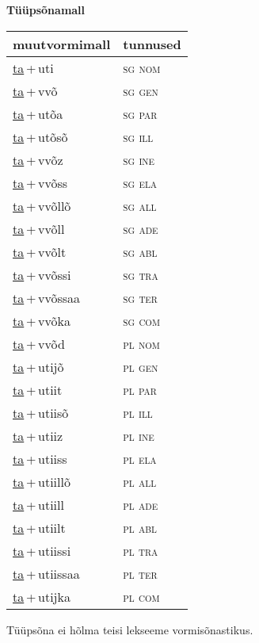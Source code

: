 
\vspace{1.8em}
\begin{minipage}{\textwidth}
\textbf{Tüüpsõnamall \,}\\

\begin{sideways}
\begin{tabular}{l l}
muutvormimall & tunnused \\
\hline
\underline{ta}\,+\,uti & \textsc{ sg nom } \\
\underline{ta}\,+\,vvõ & \textsc{ sg gen } \\
\underline{ta}\,+\,utõa & \textsc{ sg par } \\
\underline{ta}\,+\,utõsõ & \textsc{ sg ill } \\
\underline{ta}\,+\,vvõz & \textsc{ sg ine } \\
\underline{ta}\,+\,vvõss & \textsc{ sg ela } \\
\underline{ta}\,+\,vvõllõ & \textsc{ sg all } \\
\underline{ta}\,+\,vvõll & \textsc{ sg ade } \\
\underline{ta}\,+\,vvõlt & \textsc{ sg abl } \\
\underline{ta}\,+\,vvõssi & \textsc{ sg tra } \\
\underline{ta}\,+\,vvõssaa & \textsc{ sg ter } \\
\underline{ta}\,+\,vvõka & \textsc{ sg com } \\
\underline{ta}\,+\,vvõd & \textsc{ pl nom } \\
\underline{ta}\,+\,utijõ & \textsc{ pl gen } \\
\underline{ta}\,+\,utiit & \textsc{ pl par } \\
\underline{ta}\,+\,utiisõ & \textsc{ pl ill } \\
\underline{ta}\,+\,utiiz & \textsc{ pl ine } \\
\underline{ta}\,+\,utiiss & \textsc{ pl ela } \\
\underline{ta}\,+\,utiillõ & \textsc{ pl all } \\
\underline{ta}\,+\,utiill & \textsc{ pl ade } \\
\underline{ta}\,+\,utiilt & \textsc{ pl abl } \\
\underline{ta}\,+\,utiissi & \textsc{ pl tra } \\
\underline{ta}\,+\,utiissaa & \textsc{ pl ter } \\
\underline{ta}\,+\,utijka & \textsc{ pl com } \\
\end{tabular}
\end{sideways}
\label{tab:tüüpsõnamall-tauti}

\end{minipage}

 
\vspace{1em}
\noindent Tüüpsõna ei hõlma teisi lekseeme vormi\-sõnastikus.
